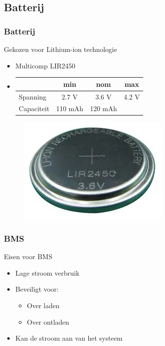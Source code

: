     \subsection{Batterij}
    \begin{frame}
        \frametitle{Batterij}
        Gekozen voor Lithium-ion technologie
        \begin{itemize}
            \item Multicomp LIR2450
            \item 
            \begin{tabular}{|l|c c c|}
                \hline
                 & min & nom & max \\ \hline
                Spanning    & 2.7 V   & 3.6 V   & 4.2 V\\ \hline
                Capaciteit  & 110 mAh & 120 mAh &      \\ \hline
            \end{tabular}            
        \end{itemize}
        \begin{figure}[h]
            \raggedleft
            \includegraphics[scale=0.3]{img/batterij.png}
        \end{figure}
    \end{frame}
        

    \begin{frame}
        \frametitle{BMS}
        Eisen voor BMS
        \begin{itemize}
            \item Lage stroom verbruik
            \item Beveiligt voor:
                \begin{itemize}
                    \item Over laden
                    \item Over ontladen
                \end{itemize}
            \item Kan de stroom aan van het systeem
            
        \end{itemize}
        
        
    
    \end{frame}

